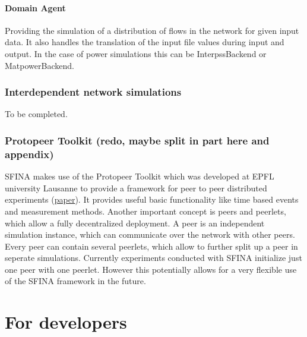 \documentclass[11pt,fleqn]{book} %
\newcommand{\DomainAgent}{Domain Agent }
\begin{document}
\subsection{\DomainAgent}\index{Agent!\DomainAgent}\label{sec:domain_agent}
Providing the simulation of a distribution of flows in the network for given input data. It also handles the translation of the input file values during input and output. In the case of power simulations this can be InterpssBackend or MatpowerBackend.

\section{Interdependent network simulations}\label{sec:interdep}
To be completed.

\section{Protopeer Toolkit (redo, maybe split in part here and appendix)}\label{subsec:protopeer}
SFINA makes use of the Protopeer Toolkit which was developed at EPFL university Lausanne to provide a framework for peer to peer distributed experiments (\href{http://infoscience.epfl.ch/record/128659/files/protopeer_demo.pdf}{paper}). It provides useful basic functionality like time based events and measurement methods. Another important concept is peers and peerlets, which allow a fully decentralized deployment. A peer is an independent simulation instance, which can communicate over the network with other peers. Every peer can contain several peerlets, which allow to further split up a peer in seperate simulations. Currently experiments conducted with SFINA initialize just one peer with one peerlet. However this potentially allows for a very flexible use of the SFINA framework in the future.



\part{For developers}
\end{document}
